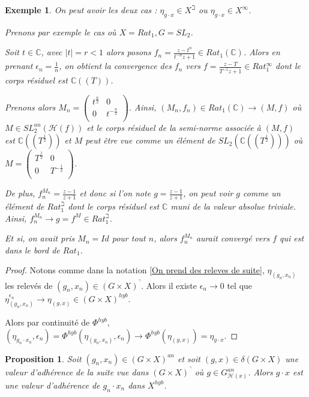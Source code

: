\documentclass[11pt]{article}
\newcommand{\C}{\mathbb{C}}
\newtheorem{prop}[thm]{Proposition}
\newtheorem{ex}[thm]{Exemple}
\begin{document}
\begin{ex}
On peut avoir les deux cas : $\eta_{g\cdot x} \in X^\beth$ ou $\eta_{g\cdot x} \in X^\infty$. 

Prenons par exemple le cas où $X = Rat_1, G = SL_2$.

Soit $t \in \C$, avec $|t| = r < 1$ alors posons $f_n = \frac{z - t^n}{t^{-n}z +1} \in Rat_1(\C)$. Alors en prenant $\epsilon_n = \frac{1}{n}$, on obtient la convergence des $f_n$ vers $f = \frac{z - T}{T^{-1}z +1}\in Rat_1^\infty$ dont le corps résiduel est $\C((T))$. 

Prenons alors $M_n = \begin{pmatrix}
t^{\frac{n}{2}} & 0\\
0 & t^{-\frac{n}{2}}\\
\end{pmatrix}$. Ainsi, $(M_n, f_n) \in Rat_1(\C) \rightarrow (M,f)$ où $M \in SL_2^{an}(\mathcal{H}(f))$ et le corps résiduel de la semi-norme associée à $(M, f)$ est $\C((T^{\frac{1}{2}}))$ et $M$ peut être vue comme un élément de $SL_2(\C((T^{\frac{1}{2}})))$ où $ M = \begin{pmatrix}
T^{\frac{1}{2}} & 0\\
0 & T^{-\frac{1}{2}}\\
\end{pmatrix}$. 

De plus, $f_n^{M_n} = \frac{z -1}{z+1}$ et donc si l'on note $g = \frac{z -1}{z+1}$, on peut voir $g$ comme un élément de $Rat_1^\beth$ dont le corps résiduel est $\C$ muni de la valeur absolue triviale. Ainsi, $f_n^{M_n} \rightarrow g = f^M \in Rat_1^\beth$.

Et si, on avait pris $M_n = Id$ pour tout $n$, alors $f_n^{M_n}$ aurait convergé vers $f$ qui est dans le bord de $Rat_1$.
\end{ex}

\begin{proof}
Notons comme dans la notation \ref{On prend des releves de suite}, $\eta_{(g_n, x_n)}$ les relevés de $(g_n, x_n) \in (G\times X)^\urcorner$. Alors il existe $\epsilon_n \rightarrow 0$ tel que $\eta_{(g_n, x_n)}^{\epsilon_n} \rightarrow \eta_{(g,x)} \in (G\times X)^{hyb}$. 

Alors par continuité de $\Phi^{hyb}$, $(\eta_{g_n \cdot x_n},{\epsilon_n}) = \Phi^{hyb}(\eta_{(g_n, x_n)},{\epsilon_n}) \rightarrow \Phi^{hyb}(\eta_{(g,x)}) = \eta_{g\cdot x}$.
\end{proof}

\begin{prop}\label{va de fg_n x_n est va de g x}
Soit $(g_n, x_n) \in (G \times X)^{an}$ et soit $(g,x) \in \delta(G \times X)$ une valeur d'adhérence de la suite vue dans $(G\times X)^\urcorner$ où $g \in G_{\mathcal{H}(x)}^{an}$. Alors $g\cdot x$ est une valeur d'adhérence de $g_n\cdot x_n$ dans $X^{hyb}$.
\end{prop}
\end{document}
